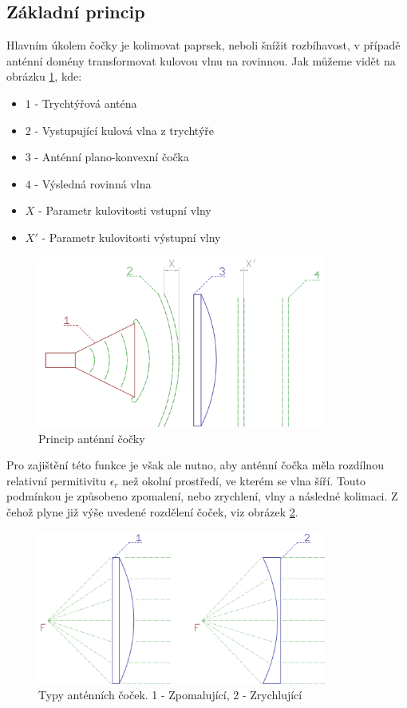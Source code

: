 \subsection{Základní princip}
Hlavním úkolem čočky je kolimovat paprsek, neboli šnížit rozbíhavost, v případě anténní domény transformovat kulovou vlnu na rovinnou. Jak můžeme vidět na obrázku \ref{fig:hornLens}, kde:
\begin{itemize}
\item $1$ - Trychtýřová anténa
\item $2$ - Vystupující kulová vlna z trychtýře
\item $3$ - Anténní plano-konvexní čočka
\item $4$ - Výsledná rovinná vlna
\item $X$ - Parametr kulovitosti vstupní vlny
\item $X'$ - Parametr kulovitosti výstupní vlny
\end{itemize}
\begin{figure}[h]
\begin{center}
\includegraphics[width=9.5cm]{pics/lens}
\caption{Princip anténní čočky}
\label{fig:hornLens}
\end{center}
\end{figure}
Pro zajištění této funkce je však ale nutno, aby anténní čočka měla rozdílnou relativní permitivitu $\epsilon_r$ než okolní prostředí, ve kterém se vlna šíří. Touto podmínkou je způsobeno zpomalení, nebo zrychlení, vlny a následné kolimaci. Z čehož plyne již výše uvedené rozdělení čoček, viz obrázek \ref{fig:LensTypes}.
\begin{figure}[h]
\begin{center}
\includegraphics[width=9.5cm]{pics/lenstypes}
\caption{Typy anténních čoček. 1 - Zpomalující, 2 - Zrychlující}
\label{fig:LensTypes}
\end{center}
\end{figure}

